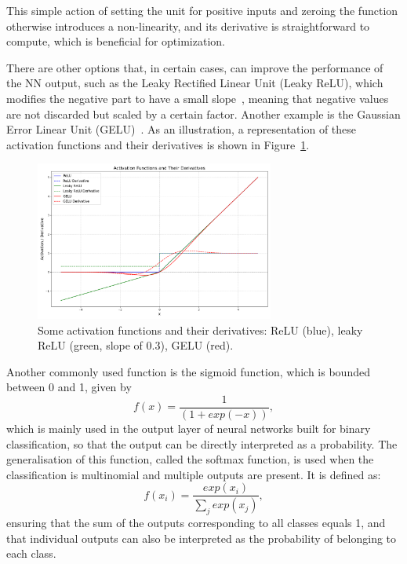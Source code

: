 This simple action of setting the unit for positive inputs and zeroing the function otherwise introduces a non-linearity, and its derivative is straightforward to compute, which is beneficial for optimization.  

There are other options that, in certain cases, can improve the performance of the NN output, such as the Leaky Rectified Linear Unit (Leaky ReLU), which modifies the negative part to have a small slope~\cite{Maas2013RectifierNI}, meaning that negative values are not discarded but scaled by a certain factor. Another example is the Gaussian Error Linear Unit (GELU)~\cite{hendrycks2023gaussianerrorlinearunits}. As an illustration, a representation of these activation functions and their derivatives is shown in Figure~\ref{fig:activation}.
\begin{figure}[htbp]
    \centering
    \includegraphics[width=0.7\textwidth]{images/activation_functions.png}
    \caption{Some activation functions and their derivatives: ReLU (blue), leaky ReLU (green, slope of 0.3), GELU (red).}
    \label{fig:activation}
\end{figure}

Another commonly used function is the sigmoid function, which is bounded between 0 and 1, given by
\begin{equation}
  f (x) = \frac{1}{(1 +exp(−x))},
\end{equation}
which is mainly used in the output layer of neural networks built for binary classification, so that the output can be directly interpreted as a probability. The generalisation of this function, called the softmax function, is used when the classification is multinomial and multiple outputs are present. It is defined as:
\begin{equation}
    f (x_{i}) = \frac{exp(x_{i})}{\sum_{j}exp(x_{j})},
\end{equation}
ensuring that the sum of the outputs corresponding to all classes equals 1, and that individual outputs can also be interpreted as the probability of belonging to each class.

